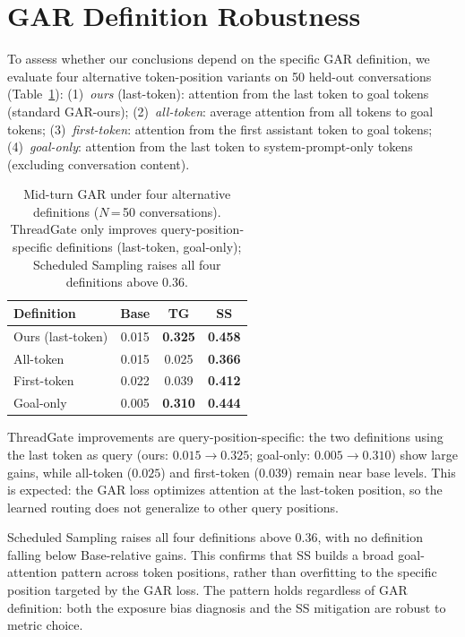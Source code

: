 \section{GAR Definition Robustness}\label{sec:appendix-gar-robust}

To assess whether our conclusions depend on the specific GAR definition, we evaluate four alternative token-position variants on 50 held-out conversations (Table~\ref{tab:gar-robust}): (1)~\emph{ours} (last-token): attention from the last token to goal tokens (standard GAR-ours); (2)~\emph{all-token}: average attention from all tokens to goal tokens; (3)~\emph{first-token}: attention from the first assistant token to goal tokens; (4)~\emph{goal-only}: attention from the last token to system-prompt-only tokens (excluding conversation content).

\begin{table}[t]
\centering\small
\caption{Mid-turn GAR under four alternative definitions ($N$\,=\,50 conversations). ThreadGate only improves query-position-specific definitions (last-token, goal-only); Scheduled Sampling raises all four definitions above 0.36.}
\label{tab:gar-robust}
\begin{tabular}{lccc}
\toprule
\textbf{Definition} & \textbf{Base} & \textbf{TG} & \textbf{SS} \\
\midrule
Ours (last-token) & 0.015 & \textbf{0.325} & \textbf{0.458} \\
All-token & 0.015 & 0.025 & \textbf{0.366} \\
First-token & 0.022 & 0.039 & \textbf{0.412} \\
Goal-only & 0.005 & \textbf{0.310} & \textbf{0.444} \\
\bottomrule
\end{tabular}
\end{table}

ThreadGate improvements are query-position-specific: the two definitions using the last token as query (ours: $0.015 \to 0.325$; goal-only: $0.005 \to 0.310$) show large gains, while all-token ($0.025$) and first-token ($0.039$) remain near base levels. This is expected: the GAR loss optimizes attention at the last-token position, so the learned routing does not generalize to other query positions.

Scheduled Sampling raises all four definitions above 0.36, with no definition falling below Base-relative gains. This confirms that SS builds a broad goal-attention pattern across token positions, rather than overfitting to the specific position targeted by the GAR loss. The pattern holds regardless of GAR definition: both the exposure bias diagnosis and the SS mitigation are robust to metric choice.

